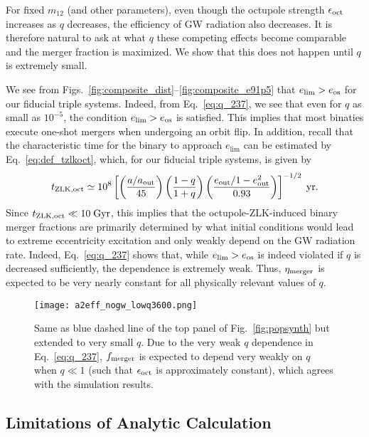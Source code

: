 \documentclass[
        fleqn,
        usenatbib,
    ]{mnras}
\newcommand*{\p}[1]{\left(#1\right)}
\newcommand*{\s}[1]{\left[#1\right]}
\begin{document}
For fixed $m_{12}$ (and other parameters), even though the octupole strength
$\epsilon_{\rm oct}$ increases as $q$ decreases, the efficiency of GW
radiation also decreases. It is therefore natural to ask at what $q$ these
competing effects become comparable and the merger fraction is maximized. We
show that this does not happen until $q$ is extremely small.

We see from Figs.~\ref{fig:composite_dist}--\ref{fig:composite_e91p5} that
$e_{\lim} > e_{\rm os}$ for our fiducial triple systems. Indeed,
from Eq.~\eqref{eq:q_237}, we see that even for $q$ as small as $10^{-5}$, the
condition $e_{\lim} > e_{\rm os}$ is satisfied. This implies that most binaties
execute one-shot mergers when undergoing an orbit flip. In addition, recall that
the characteristic time for the binary to approach $e_{\lim}$ can be estimated
by Eq.~\eqref{eq:def_tzlkoct}, which, for our fiducial triple systems, is given
by
\begin{equation}
    t_{\rm ZLK, oct} \simeq 10^8\s{\p{\frac{a / a_{\rm out}}{45}}
        \p{\frac{1 - q}{1 + q}}\p{\frac{e_{\rm out} / 1 - e_{\rm
        out}^2}{0.93}}}^{-1/2}\;\mathrm{yr}.
\end{equation}
Since $t_{\rm ZLK, oct } \ll 10\;\mathrm{Gyr}$, this implies that the
octupole-ZLK-induced binary merger fractions are primarily determined by what
initial conditions would lead to extreme eccentricity excitation and only weakly
depend on the GW radiation rate. Indeed, Eq.~\eqref{eq:q_237} shows that, while
$e_{\lim} > e_{\rm os}$ is indeed violated if $q$ is decreased sufficiently, the
dependence is extremely weak. Thus, $\eta_{\rm merger}$ is expected to be very
nearly constant for all physically relevant values of $q$.
\begin{figure}
    \centering
    \texttt{[image: a2eff\_nogw\_lowq3600.png]}
    \caption{Same as blue dashed line of the top panel of
    Fig.~\ref{fig:popsynth} but extended to very small $q$. Due to the very weak
    $q$ dependence in Eq.~\eqref{eq:q_237}, $f_{\rm merger}$ is expected to
    depend very weakly on $q$ when $q \ll 1$ (such that $\epsilon_{\rm oct}$ is
    approximately constant), which agrees with the simulation
    results.}\label{fig:popsynth_lowq}
\end{figure}

\subsection{Limitations of Analytic Calculation}\label{ss:completeness}
\end{document}
